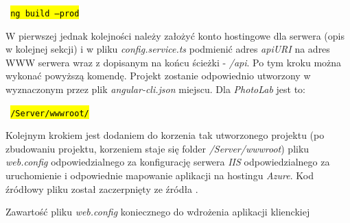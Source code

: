 \vspace{2mm}

    \centerline{\texttt{\hl{ ng build --prod }}}

\vspace{2mm}
\noindent W pierwszej jednak kolejności należy założyć konto hostingowe dla serwera (opis w kolejnej sekcji) i w pliku \textit{config.service.ts} podmienić adres \textit{apiURI} na adres WWW serwera wraz z dopisanym na końcu ścieżki - \textit{/api}. Po tym kroku można wykonać powyższą komendę.
Projekt zostanie odpowiednio utworzony w wyznaczonym przez plik \textit{angular-cli.json} miejscu. Dla \textit{PhotoLab} jest to:

\vspace{2mm}

    \centerline{\texttt{\hl{ /Server/wwwroot/ }}}

\vspace{2mm}

\noindent Kolejnym krokiem jest dodaniem do korzenia tak utworzonego projektu (po zbudowaniu projektu, korzeniem staje się folder \textit{/Server/wwwroot}) pliku \textit{web.config} odpowiedzialnego za konfigurację serwera \textit{IIS} odpowiedzialnego za uruchomienie i odpowiednie mapowanie aplikacji na hostingu \textit{Azure}. Kod źródłowy  pliku został zaczerpnięty ze źródła \cite{deploying-angular}.
\newpage

\begin{listing}[ht]
    \caption{Zawartość pliku \textit{web.config} koniecznego do wdrożenia aplikacji klienckiej}
    \label{listing:web-config}
\end{listing}

